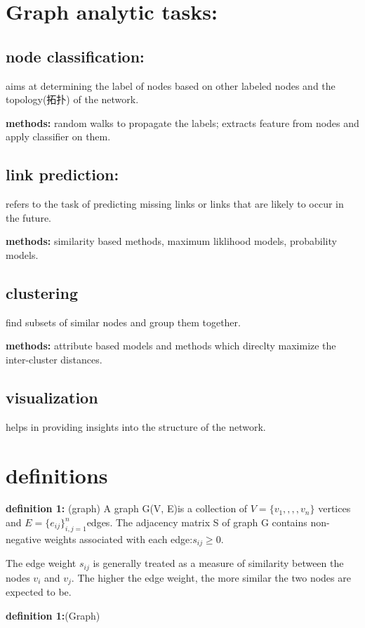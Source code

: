 \documentclass{ctexart}
\begin{document}
	
	\section{Graph analytic tasks:}
	
	\subsection{node classification:}
	
	aims at determining the {\color{red}label of nodes} based on other labeled nodes and the topology(拓扑) of the network.
	
	\textbf{methods: }random walks to propagate the labels; extracts feature from nodes and apply classifier on them.
	
	\subsection{link prediction:}
	
	refers to the task of predicting missing links or links that are likely to occur in the future.
	
	\textbf{methods: }similarity based methods, maximum liklihood models, probability models.
	
	\subsection{clustering}
	
	find subsets of similar nodes and group them together.
	
	\textbf{methods: }attribute based models and methods which direclty maximize the inter-cluster distances.
	
	\subsection{visualization}
	
	helps in providing insights into the structure of the network.
	
	\section{definitions}
	
	\textbf{definition 1: }(graph) A graph G(V, E)is a collection of \(V = \{v_1,,,,v_n\}\) vertices and \(E = \{e_{ij}\}^n_{i,j=1}\)edges. The adjacency matrix S of graph G contains non-negative weights associated with each edge:\(s_{ij} \geq 0\).
	
	The edge weight \(s_{ij}\) is generally treated as a measure of similarity between the nodes \(v_i\) and \(v_j\). {\color{red}The higher the edge weight, the more similar the two nodes are expected to be.}
	
	
	\textbf{definition 1:}(Graph)
	
	
\end{document}
